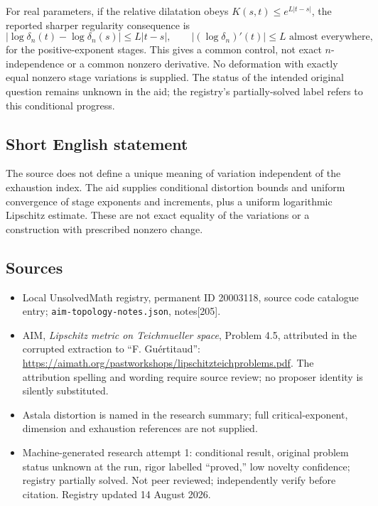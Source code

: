 \documentclass[11pt]{article}
\begin{document}
For real parameters, if the relative dilatation obeys $K(s,t)\leq e^{L|t-s|}$, the reported sharper regularity consequence is
\[
 |\log\delta_n(t)-\log\delta_n(s)|\leq L|t-s|,
 \qquad |(\log\delta_n)'(t)|\leq L\text{ almost everywhere},
\]
for the positive-exponent stages. This gives a common control, not exact $n$-independence or a common nonzero derivative. No deformation with exactly equal nonzero stage variations is supplied. The status of the intended original question remains unknown in the aid; the registry's partially-solved label refers to this conditional progress.
\subsection{Short English statement}
The source does not define a unique meaning of variation independent of the exhaustion index. The aid supplies conditional distortion bounds and uniform convergence of stage exponents and increments, plus a uniform logarithmic Lipschitz estimate. These are not exact equality of the variations or a construction with prescribed nonzero change.
\subsection{Sources}
\begin{itemize}
\item Local UnsolvedMath registry, permanent ID 20003118, source code catalogue entry; \texttt{aim-topology-notes.json}, notes[205].
\item AIM, \emph{Lipschitz metric on Teichmueller space}, Problem 4.5, attributed in the corrupted extraction to ``F. Gu\'ertitaud'': \url{https://aimath.org/pastworkshops/lipschitzteichproblems.pdf}. The attribution spelling and wording require source review; no proposer identity is silently substituted.
\item Astala distortion is named in the research summary; full critical-exponent, dimension and exhaustion references are not supplied.
\item Machine-generated research attempt 1: conditional result, original problem status unknown at the run, rigor labelled ``proved,'' low novelty confidence; registry partially solved. Not peer reviewed; independently verify before citation. Registry updated 14 August 2026.
\end{itemize}
\end{document}
